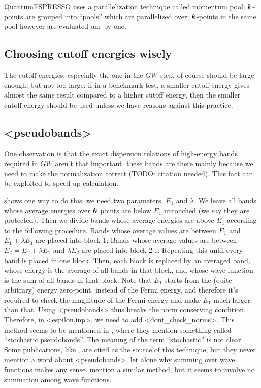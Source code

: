 \documentclass[hyperref, a4paper, 12pt]{report}
\def\texttt#1{<#1>}%
\newcommand{\shortcode}[1]{\texttt{#1}}
\begin{document}
QuantumESPRESSO uses a parallelization technique called momentum pool: 
$\vb*{k}$-points are grouped into ``pools''
which are parallelized over; 
$\vb*{k}$-points in the same pool however are evaluated one by one.

\subsection{Choosing cutoff energies wisely}

The cutoff energies, especially the one in the $GW$ step,
of course should be large enough, but not too large:
if in a benchmark test, 
a smaller cutoff energy gives almost the same result 
compared to a higher cutoff energy,
then the smaller cutoff energy should be used 
unless we have reasons against this practice.

\subsection{\shortcode{pseudobands}}

One observation is that the exact dispersion relations of high-energy bands required in $GW$ 
aren't that important:
these bands are there mainly because 
we need to make the normalization correct
(TODO: citation needed).
This fact can be exploited to speed up calculation.

 shows one way to do this: 
we need two parameters, $E_1$ and $\lambda$.
We leave all bands whose average energies over $\vb*{k}$ points 
are below $E_1$ untouched (we say they are protected).
Then we divide bands whose average energies are above $E_1$ 
according to the following procedure.
Bands whose average values are between $E_1$ and $E_1 + \lambda E_1$ 
are placed into block 1;
Bands whose average values are between $E_2 = E_1 + \lambda E_1$ and $\lambda E_2$
are placed into block 2 \dots
Repeating this until every band is placed in one block.
Then, each block is replaced by an averaged band,
whose energy is the average of all bands in that block, 
and whose wave function is the sum of all bands in that block.
Note that $E_1$ starts from the (quite arbitrary) energy zero-point,
instead of the Fermi energy,
and therefore it's required to check 
the magnitude of the Fermi energy 
and make $E_1$ much larger than that.
Using \shortcode{pseudobands} thus breaks the norm conserving condition.
Therefore, in \shortcode{espilon.inp},
we need to add \shortcode{dont_check_norms}.
This method seems to be mentioned in \cite{del2019large,gao2022quasiparticle},
where they mention something called ``stochastic pseudobands''.
The meaning of the term ``stochastic'' is not clear.
Some publications, like \cite{hung2016excitation,del2019static},
are cited as the source of this technique,
but they never mention a word about \shortcode{pseudobands},
let alone why summing over wave functions makes any sense.
\cite{gaospeeding2016} mention a similar method, 
but it seems to involve no summation among wave functions.
\end{document}
